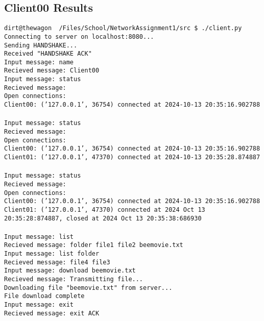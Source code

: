\documentclass{article}
\begin{document}
\subsection{Client00 Results}
\texttt{dirt@thewagon ~/Files/School/NetworkAssignment1/src \$ ./client.py\\
Connecting to server on localhost:8080...\\
Sending HANDSHAKE...\\
Received "HANDSHAKE ACK"\\
Input message: name\\
Recieved message: Client00\\
Input message: status\\
Recieved message: \\
Open connections:\\
Client00: ('127.0.0.1', 36754) connected at 2024-10-13 20:35:16.902788\\
\\
Input message: status\\
Recieved message: \\
Open connections:\\
Client00: ('127.0.0.1', 36754) connected at 2024-10-13 20:35:16.902788\\
Client01: ('127.0.0.1', 47370) connected at 2024-10-13 20:35:28.874887\\
\\
Input message: status\\
Recieved message: \\
Open connections:\\
Client00: ('127.0.0.1', 36754) connected at 2024-10-13 20:35:16.902788\\
Client01: ('127.0.0.1', 47370) connected at 2024 Oct 13 20:35:28:874887, closed at 2024 Oct 13 20:35:38:686930\\
\\
Input message: list\\
Recieved message: folder file1 file2 beemovie.txt\\
Input message: list folder\\
Recieved message: file4 file3\\
Input message: download beemovie.txt\\
Recieved message: Transmitting file...\\
Downloading file "beemovie.txt" from server...\\
File download complete\\
Input message: exit\\
Recieved message: exit ACK}
\end{document}
